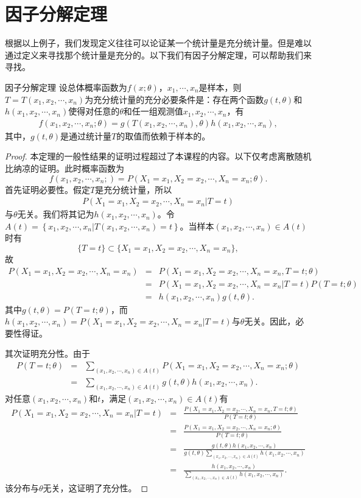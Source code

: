 \section{因子分解定理}
根据以上例子，我们发现定义往往可以论证某一个统计量是充分统计量。但是难以通过定义来寻找那个统计量是充分的。以下我们有因子分解定理，可以帮助我们来寻找。
\begin{theorem}{因子分解定理}
设总体概率函数为$f(x;\theta)$，$x_1,\cdots,x_n$是样本，则$T = T(x_1,x_2,\cdots,x_n)$为充分统计量的充分必要条件是：存在两个函数$g(t,\theta)$和$h(x_1,x_2,\cdots,x_n)$使得对任意的$\theta$和任一组观测值$x_1,x_2,\cdots,x_n$，有
\begin{eqnarray*}
    f(x_1,x_2,\cdots,x_n;\theta) = g(T(x_1,x_2,\cdots,x_n),\theta)h(x_1,x_2,\cdots,x_n),
\end{eqnarray*}
其中，$g(t,\theta)$是通过统计量$T$的取值而依赖于样本的。
\end{theorem}
\begin{proof}
本定理的一般性结果的证明过程超过了本课程的内容。以下仅考虑离散随机比纳凉的证明。此时概率函数为
$$
f(x_1,x_2,\cdots,x_n;) = P(X_1 = x_1,X_2=x_2,\cdots,X_n = x_n;\theta).
$$
首先证明必要性。假定$T$是充分统计量，所以
\begin{eqnarray*}
    P(X_1 = x_1,X_2=x_2,\cdots,X_n = x_n|T=t)
\end{eqnarray*}
与$\theta$无关。我们将其记为$h(x_1,x_2,\cdots,x_n)$。令$A(t) = \left\{x_1,x_2,\cdots,x_n | T(x_1,x_2,\cdots,x_n) = t\right\}$。当样本$(x_1,x_2,\cdots,x_n) \in A(t)$时有
$$
\{T = t\} \subset \{X_1 = x_1,X_2=x_2,\cdots,X_n = x_n\},
$$
故
\begin{eqnarray*}
    P(X_1 =x_1,X_2=x_2,\cdots,X_n = x_n ) &=&  
    P(X_1 =x_1,X_2=x_2,\cdots,X_n = x_n , T= t;\theta) \\
    &=& P(X_1 =x_1,X_2=x_2,\cdots,X_n = x_n | T= t) P(T =t;\theta)\\
    &=& h(x_1,x_2,\cdots,x_n) g(t,\theta).
\end{eqnarray*}
其中$g(t,\theta) = P(T = t;\theta)$，而$h(x_1,x_2,\cdots,x_n) = P(X_1=x_1,X_2=x_2,\cdots,X_n = x_n|T=t)$与$\theta$无关。因此，必要性得证。

其次证明充分性。由于
\begin{eqnarray*}
    P(T=t;\theta) &=& \sum_{(x_1,x_2,\cdots,x_n)\in A(t)} P(X_1 = x_1,X_2=x_2,\cdots,X_n=x_n;\theta)\\
    &=&  \sum_{(x_1,x_2,\cdots,x_n)\in A(t)} g(t,\theta) h(x_1,x_2,\cdots,x_n).
\end{eqnarray*}
对任意$(x_1,x_2,\cdots,x_n)$和$t$，满足$(x_1,x_2,\cdots,x_n)\in A(t)$有
\begin{eqnarray*}
    P(X_1 = x_1,X_2=x_2,\cdots,X_n=x_n|T=t) &=& \frac{P(X_1 = x_1,X_2=x_2,\cdots,X_n=x_n,T = t;\theta)}{P(T=t;\theta)}\\
    &=& \frac{P(X_1 = x_1,X_2=x_2,\cdots,X_n=x_n;\theta)}{P(T=t;\theta)}
    \\
    &=& \frac{g(t,\theta) h(x_1,x_2,\cdots,x_n)}{ g(t,\theta)\sum_{(x_1,x_2,\cdots,x_n)\in A(t)}  h(x_1,x_2,\cdots,x_n)}\\
    &=&  \frac{h(x_1,x_2,\cdots,x_n)}{ \sum_{(x_1,x_2,\cdots,x_n)\in A(t)}  h(x_1,x_2,\cdots,x_n)}
    .
\end{eqnarray*}
该分布与$\theta$无关，这证明了充分性。
\end{proof}

